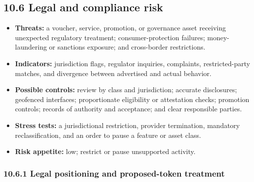 \documentclass[11pt]{article}
\begin{document}
\subsection*{10.6 Legal and compliance risk}

\begin{itemize}[leftmargin=*]
\item \textbf{Threats:} a voucher, service, promotion, or governance asset receiving unexpected regulatory treatment; consumer-protection failures; money-laundering or sanctions exposure; and cross-border restrictions.
\item \textbf{Indicators:} jurisdiction flags, regulator inquiries, complaints, restricted-party matches, and divergence between advertised and actual behavior.
\item \textbf{Possible controls:} review by class and jurisdiction; accurate disclosures; geofenced interfaces; proportionate eligibility or attestation checks; promotion controls; records of authority and acceptance; and clear responsible parties.
\item \textbf{Stress tests:} a jurisdictional restriction, provider termination, mandatory reclassification, and an order to pause a feature or asset class.
\item \textbf{Risk appetite:} low; restrict or pause unsupported activity.
\end{itemize}
\subsubsection*{10.6.1 Legal positioning and proposed-token treatment}
\end{document}
